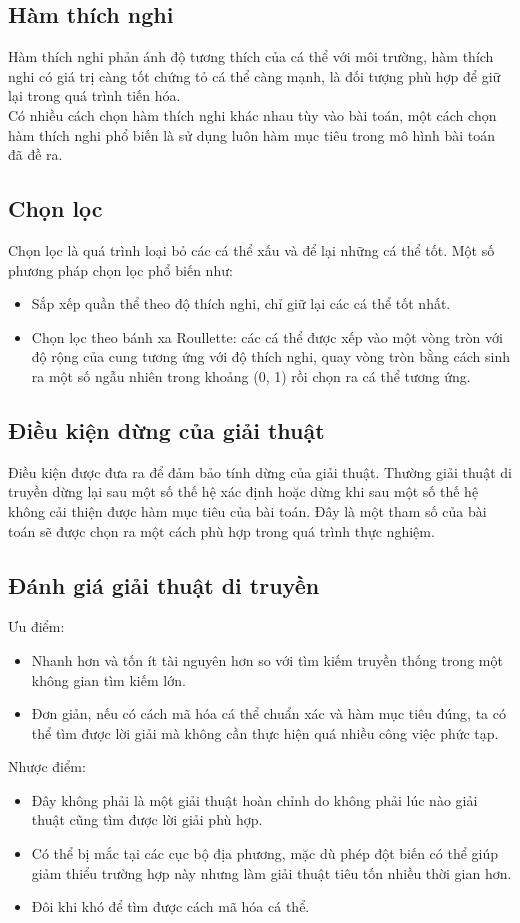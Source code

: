 \subsection{Hàm thích nghi }
Hàm thích nghi phản ánh độ tương thích của cá thể với môi trường, hàm thích nghi có giá trị càng tốt chứng tỏ cá thể càng mạnh, là đối tượng phù hợp để giữ lại trong quá trình tiến hóa.
\\Có nhiều cách chọn hàm thích nghi khác nhau tùy vào bài toán, một cách chọn hàm thích nghi phổ biến là sử dụng luôn hàm mục tiêu trong mô hình bài toán đã đề ra.
\subsection{Chọn lọc}
Chọn lọc là quá trình loại bỏ các cá thể xấu và để lại những cá thể tốt. Một số phương pháp chọn lọc phổ biến như: 
\begin{itemize}
    \item Sắp xếp quần thể theo độ thích nghi, chỉ giữ lại các cá thể tốt nhất.
    \item Chọn lọc theo bánh xa Roullette: các cá thể được xếp vào một vòng tròn với độ rộng của cung tương ứng với độ thích nghi, quay vòng tròn bằng cách sinh ra một số ngẫu nhiên trong khoảng (0, 1) rồi chọn ra cá thể tương ứng.
\end{itemize}
\subsection{Điều kiện dừng của giải thuật}
Điều kiện được đưa ra để đảm bảo tính dừng của giải thuật. Thường giải thuật di truyền dừng lại sau một số thế hệ xác định hoặc dừng khi sau một số thế hệ không cải thiện được hàm mục tiêu của bài toán. Đây là một tham số của bài toán sẽ được chọn ra một cách phù hợp trong quá trình thực nghiệm.
\subsection{Đánh giá giải thuật di truyền}
Ưu điểm:
\begin{itemize}
    \item Nhanh hơn và tốn ít tài nguyên hơn so với tìm kiếm truyền thống trong một không gian tìm kiếm lớn.
    \item Đơn giản, nếu có cách mã hóa cá thể chuẩn xác và hàm mục tiêu đúng, ta có thể tìm được lời giải mà không cần thực hiện quá nhiều công việc phức tạp.
\end{itemize}
Nhược điểm: 
\begin{itemize}
    \item Đây không phải là một giải thuật hoàn chỉnh do không phải lúc nào giải thuật cũng tìm được lời giải phù hợp.
    \item Có thể bị mắc tại các cục bộ địa phương, mặc dù phép đột biến có thể giúp giảm thiểu trường hợp này nhưng làm giải thuật tiêu tốn nhiều thời gian hơn.
    \item Đôi khi khó để tìm được cách mã hóa cá thể.    
\end{itemize}
